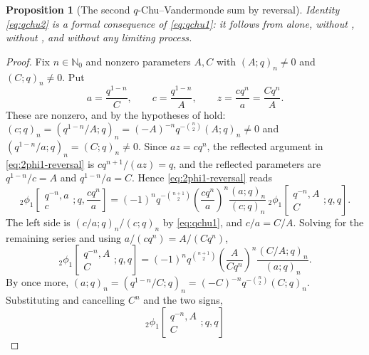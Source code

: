 \documentclass[11pt,oneside,openany]{book}
\newtheorem{proposition}[proposition]{Proposition}
\theoremstyle{definition}
\theoremstyle{remark}
\newcommand{\C}{\mathbb C}
\newcommand{\N}{\mathbb N}
\begin{document}
\begin{proposition}[The second $q$-Chu--Vandermonde sum by reversal]\label{prop:qchu2-by-reversal}
Identity \eqref{eq:qchu2} is a formal consequence of \eqref{eq:qchu1}: it follows from  alone, without , without , and without any limiting process.
\end{proposition}

\begin{proof}
Fix $n\in\N_0$ and nonzero parameters $A,C$ with $(A;q)_n\ne0$ and $(C;q)_n\ne0$.  Put
\[
 a=\frac{q^{1-n}}{C},\qquad
 c=\frac{q^{1-n}}{A},\qquad
 z=\frac{cq^{n}}{a}=\frac{Cq^{n}}{A}.
\]
These are nonzero, and by  the hypotheses of  hold: $(c;q)_n=(q^{1-n}/A;q)_n=(-A)^{-n}q^{-\binom n2}(A;q)_n\ne0$ and $(q^{1-n}/a;q)_n=(C;q)_n\ne0$.  Since $az=cq^{n}$, the reflected argument in \eqref{eq:2phi1-reversal} is $cq^{n+1}/(az)=q$, and the reflected parameters are $q^{1-n}/c=A$ and $q^{1-n}/a=C$.  Hence \eqref{eq:2phi1-reversal} reads
\[
 {}_2\phi_1\!\left[
 \begin{matrix}q^{-n},a\\c\end{matrix};q,\frac{cq^n}{a}\right]
 =(-1)^nq^{-\binom{n+1}{2}}
 \left(\frac{cq^{n}}{a}\right)^{n}
 \frac{(a;q)_n}{(c;q)_n}\,
 {}_2\phi_1\!\left[
 \begin{matrix}q^{-n},A\\C\end{matrix};q,q\right].
\]
The left side is $(c/a;q)_n/(c;q)_n$ by \eqref{eq:qchu1}, and $c/a=C/A$.  Solving for the remaining series and using $a/(cq^{n})=A/(Cq^{n})$,
\[
 {}_2\phi_1\!\left[
 \begin{matrix}q^{-n},A\\C\end{matrix};q,q\right]
 =(-1)^nq^{\binom{n+1}{2}}
 \left(\frac{A}{Cq^{n}}\right)^{n}
 \frac{(C/A;q)_n}{(a;q)_n}.
\]
By  once more, $(a;q)_n=(q^{1-n}/C;q)_n=(-C)^{-n}q^{-\binom n2}(C;q)_n$.  Substituting and cancelling $C^{n}$ and the two signs,
\[
 {}_2\phi_1\!\left[
 \begin{matrix}q^{-n},A\\C\end{matrix};q,q\right]
\]
\end{proof}
\end{document}
